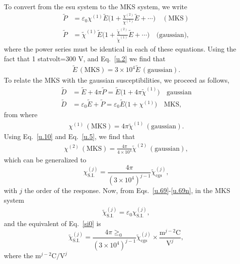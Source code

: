 \documentclass[12pt]{article}
\numberwithin{equation}{section}
\begin{document}
\begin{enumerate}
To convert from the esu system to the MKS system, we write
\begin{align}\label{u.5}
\tilde P&=\varepsilon_0
\chi^{(1)}\tilde E\Big(1+\frac{\chi^{(2)}}{\chi^{(1)}}\tilde E+\cdots\Big) \quad(\text{MKS})
\nonumber\\
\tilde P&=\tilde\chi^{(1)}\tilde E\Big(1+\frac{\tilde\chi^{(2)}}{\tilde\chi^{(1)}}\tilde E+\cdots  \Big)\quad\text{(gaussian)}
,
\end{align} 
where the power series must be identical in each of these equations.
Using the fact that 1 statvolt=300 V, and Eq.~\eqref{u.2} we find that 
\begin{align}\label{u.10}
\tilde E\, (\text{MKS})=3\times 10^4\tilde E \,(\text{gaussian})
.
\end{align}
To relate the MKS with the gaussian susceptibilities, we proceed as
follows,
\begin{align}\label{u.11}
\tilde D &= \tilde E + 4\pi\tilde P 
=\tilde E\big(1+4\pi\tilde \chi^{(1)})\quad\text{gaussian}
\nonumber\\
\tilde D &= \varepsilon_0\tilde E + \tilde P 
=\varepsilon_0\tilde E\big(1+ \chi^{(1)})\quad\text{MKS}
,
\end{align}   
from where
\begin{align}\label{u.12}
\chi^{(1)}\,(\text{MKS})= 
4\pi\tilde \chi^{(1)}\,(\text{gaussian})  
.  
\end{align}   
Using Eq.~\eqref{u.10} and Eq.~\eqref{u.5}, we find that
\begin{align}\label{u.13}
\chi^{(2)}\,(\text{MKS})=
\frac{4\pi}{4\times 10^4}\tilde \chi^{(2)}\,(\text{gaussian}) 
, 
\end{align}  
which can be generalized to
\begin{equation}\label{si0}
\chi_{\mathrm{S.I.}}^{(j)}=\frac{4\pi}{(3\times 
 10^4)^{j-1}}\tilde\chi^{(j)}_{\mathrm{cgs}}
,
\end{equation} 
with $j$ the order of the response.  Now, from Eqs.~\eqref{u.69}-\eqref{u.69n}, in
the MKS system
\begin{align}\label{u.20}
\tilde\chi^{(j)}_{\text{S.I.}}=\varepsilon_0\chi^{(j)}_{\text{S.I.}}
,
\end{align}
and the equivalent of Eq.~\eqref{si0} is
\begin{equation}\label{si.2}
\tilde\chi_{\mathrm{S.I.}}^{(j)}=\frac{4\pi\ge_0}{(3\times 
 10^4)^{j-1}}\tilde\chi^{(j)}_{\mathrm{cgs}} \times 
\frac{\text{m}^{j-2}\text{C}}{\text{V}^j}
,
\end{equation}  
where the 
$\text{m}^{j-2}\text{C}/\text{V}^j$

\end{enumerate}
\end{document}
